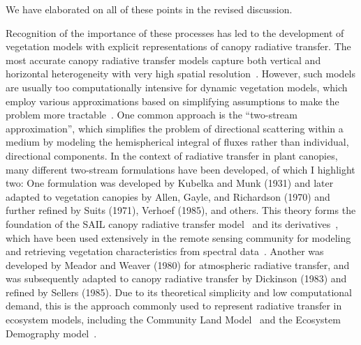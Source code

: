 We have elaborated on all of these points in the revised discussion.


Recognition of the importance of these processes has led to the development of vegetation models with explicit representations of canopy radiative transfer.
The most accurate canopy radiative transfer models capture both vertical and horizontal heterogeneity with very high spatial resolution~\parencite{widlowski2007third}.
However, such models are usually too computationally intensive for dynamic vegetation models, which employ various approximations based on simplifying assumptions to make the problem more tractable~\parencite{fisher2017vegetation}.
One common approach is the ``two-stream approximation'', which simplifies the problem of directional scattering within a medium by modeling the hemispherical integral of fluxes rather than individual, directional components.
In the context of radiative transfer in plant canopies, many different two-stream formulations have been developed, of which I highlight two:
One formulation was developed by Kubelka and Munk (1931)\nocite{kubelka1931article} and later adapted to vegetation canopies by Allen, Gayle, and Richardson (1970)\nocite{allen1970plantcanopy} and further refined by Suits (1971)\nocite{suits1971calculation}, Verhoef (1985)\nocite{verhoef1984light}, and others.
This theory forms the foundation of the SAIL canopy radiative transfer model~\parencite{verhoef1984light} and its derivatives~\parencite[e.g. 4SAIL][]{verhoef2007unified}, which have been used extensively in the remote sensing community for modeling and retrieving vegetation characteristics from spectral data~\cite{jacquemoud2009prospect}.
Another was developed by Meador and Weaver (1980)\nocite{meador1980twostream} for atmospheric radiative transfer, and was subsequently adapted to canopy radiative transfer by Dickinson (1983)\nocite{dickinson_1983_land} and refined by Sellers (1985)\nocite{sellers1985canopy}.
Due to its theoretical simplicity and low computational demand, this is the approach commonly used to represent radiative transfer in ecosystem models, including the Community Land Model~\parencite[CLM,][]{clm45_note} and the Ecosystem Demography model~\cite[ED,][]{moorcroft_2001_method, medvigy2009mechanistic, longo_2019_ed1}.
